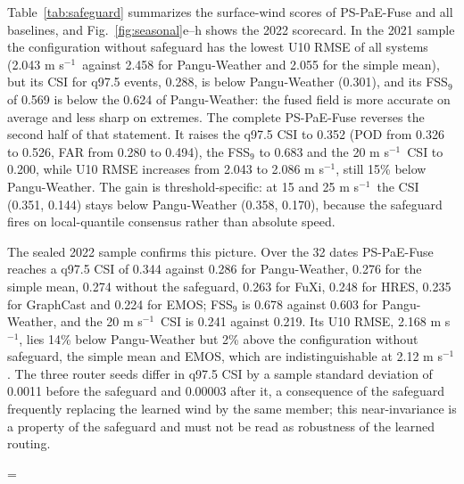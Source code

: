 \documentclass[12pt]{article}
\newcommand{\fitTable}[1]{\begingroup\linespread{1}\selectfont\setbox0=\hbox{#1}\ifdim\wd0>\linewidth\resizebox{\linewidth}{!}{\box0}\else\box0\fi\endgroup}
\newcommand{\mps}{m s$^{-1}$}
\begin{document}
Table~\ref{tab:safeguard} summarizes the surface-wind scores of PS-PaE-Fuse and all baselines, and Fig.~\ref{fig:seasonal}e--h shows the 2022 scorecard. In the 2021 sample the configuration without safeguard has the lowest U10 RMSE of all systems (2.043 \mps\ against 2.458 for Pangu-Weather and 2.055 for the simple mean), but its CSI for q97.5 events, 0.288, is below Pangu-Weather (0.301), and its FSS$_{9}$ of 0.569 is below the 0.624 of Pangu-Weather: the fused field is more accurate on average and less sharp on extremes. The complete PS-PaE-Fuse reverses the second half of that statement. It raises the q97.5 CSI to 0.352 (POD from 0.326 to 0.526, FAR from 0.280 to 0.494), the FSS$_{9}$ to 0.683 and the 20 \mps\ CSI to 0.200, while U10 RMSE increases from 2.043 to 2.086 \mps, still 15\% below Pangu-Weather. The gain is threshold-specific: at 15 and 25 \mps\ the CSI (0.351, 0.144) stays below Pangu-Weather (0.358, 0.170), because the safeguard fires on local-quantile consensus rather than absolute speed.

The sealed 2022 sample confirms this picture. Over the 32 dates PS-PaE-Fuse reaches a q97.5 CSI of 0.344 against 0.286 for Pangu-Weather, 0.276 for the simple mean, 0.274 without the safeguard, 0.263 for FuXi, 0.248 for HRES, 0.235 for GraphCast and 0.224 for EMOS; FSS$_{9}$ is 0.678 against 0.603 for Pangu-Weather, and the 20 \mps\ CSI is 0.241 against 0.219. Its U10 RMSE, 2.168 \mps, lies 14\% below Pangu-Weather but 2\% above the configuration without safeguard, the simple mean and EMOS, which are indistinguishable at 2.12 \mps. The three router seeds differ in q97.5 CSI by a sample standard deviation of 0.0011 before the safeguard and 0.00003 after it, a consequence of the safeguard frequently replacing the learned wind by the same member; this near-invariance is a property of the safeguard and must not be read as robustness of the learned routing.

\begin{table}[t]
\caption{Surface-wind scorecard of PS-PaE-Fuse and all baselines on the 2021 sample (22 dates) and the sealed 2022 sample (32 dates), equal-lead means; PS-PaE-Fuse rows are three-seed means. U10 RMSE is the RMSE of the zonal component; CSI, POD, FAR and FSS$_{9}$ refer to wind-speed events at the local q97.5 threshold; CSI$_{20}$ to 20 \mps. Member FSS$_{9}$ in 2021 is from the archived raw-member evaluation; dashes mark scores not archived for that system.}
\label{tab:safeguard}
\vspace*{2mm}
\centering
\small
\fitTable{}
\end{table}
\end{document}
